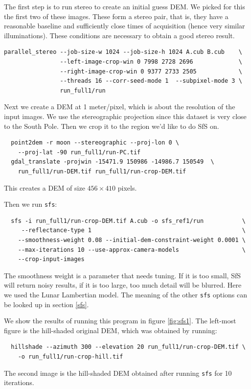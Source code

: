 The first step is to run stereo to create an initial guess DEM. We
picked for this the first two of these images. These form a stereo pair,
that is, they have a reasonable baseline and sufficiently close times of
acquisition (hence very similar illuminations). These conditions are
necessary to obtain a good stereo result.
\begin{verbatim}
parallel_stereo --job-size-w 1024 --job-size-h 1024 A.cub B.cub    \
                --left-image-crop-win 0 7998 2728 2696             \
                --right-image-crop-win 0 9377 2733 2505            \
                --threads 16 --corr-seed-mode 1  --subpixel-mode 3 \
                run_full1/run
\end{verbatim}
Next we create a DEM at 1 meter/pixel, which is about the resolution
of the input images. We use the stereographic projection since this
dataset is very close to the South Pole. Then we crop it to the region
we'd like to do SfS on.
\begin{verbatim}
  point2dem -r moon --stereographic --proj-lon 0 \
    --proj-lat -90 run_full1/run-PC.tif
  gdal_translate -projwin -15471.9 150986 -14986.7 150549  \
    run_full1/run-DEM.tif run_full1/run-crop-DEM.tif
\end{verbatim}
This creates a DEM of size $456 \times 410$ pixels.

Then we run \texttt{sfs}:
\begin{verbatim}
  sfs -i run_full1/run-crop-DEM.tif A.cub -o sfs_ref1/run           \
     --reflectance-type 1                                           \
    --smoothness-weight 0.08 --initial-dem-constraint-weight 0.0001 \
    --max-iterations 10 --use-approx-camera-models                  \
    --crop-input-images
\end{verbatim}

The smoothness weight is a parameter that needs tuning. If it is too
small, SfS will return noisy results, if it is too large, too much
detail will be blurred. Here we used the Lunar Lambertian model. The
meaning of the other \texttt{sfs} options can be looked up in section
\ref{sfs}.

We show the results of running this program in figure
\ref{fig:sfs1}. The left-most figure is the hill-shaded original DEM,
which was obtained by running:
\begin{verbatim}
  hillshade --azimuth 300 --elevation 20 run_full1/run-crop-DEM.tif \
    -o run_full1/run-crop-hill.tif 
\end{verbatim}
The second image is the hill-shaded DEM obtained after running
\texttt{sfs} for 10 iterations.

